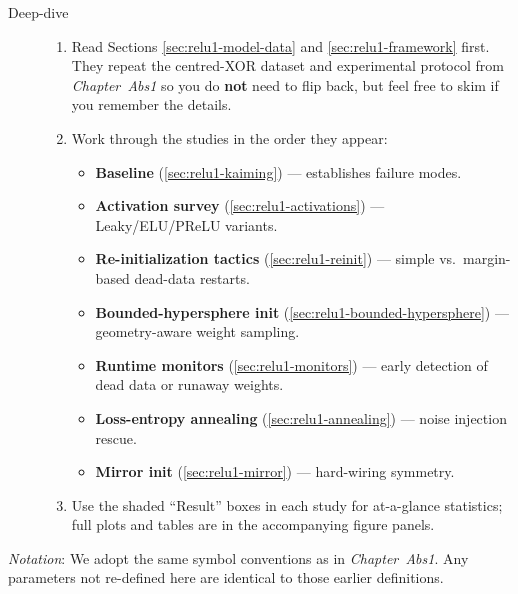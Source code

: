 \begin{description}
  \item[Deep-dive]
        \begin{enumerate}
          \item Read Sections \ref{sec:relu1-model-data} and \ref{sec:relu1-framework} first.  
                They repeat the centred-XOR dataset and experimental protocol from \emph{Chapter~Abs1} so you do \textbf{not} need to flip back, but feel free to skim if you remember the details.
          \item Work through the studies in the order they appear:
                \begin{itemize}
                    \item \textbf{Baseline} (\ref{sec:relu1-kaiming})  
                          — establishes failure modes.
                    \item \textbf{Activation survey} (\ref{sec:relu1-activations})  
                          — Leaky/ELU/PReLU variants.
                    \item \textbf{Re-initialization tactics} (\ref{sec:relu1-reinit})  
                          — simple vs.\ margin-based dead-data restarts.
                    \item \textbf{Bounded-hypersphere init} (\ref{sec:relu1-bounded-hypersphere})  
                          — geometry-aware weight sampling.
                    \item \textbf{Runtime monitors} (\ref{sec:relu1-monitors})  
                          — early detection of dead data or runaway weights.
                    \item \textbf{Loss-entropy annealing} (\ref{sec:relu1-annealing})  
                          — noise injection rescue.
                    \item \textbf{Mirror init} (\ref{sec:relu1-mirror})  
                          — hard-wiring symmetry.
                \end{itemize}
          \item Use the shaded “Result” boxes in each study for at-a-glance statistics; full plots and tables are in the accompanying figure panels.
        \end{enumerate}
\end{description}

\medskip\noindent
\textit{Notation}: We adopt the same symbol conventions as in \emph{Chapter~Abs1}.  Any parameters not re-defined here are identical to those earlier definitions.
